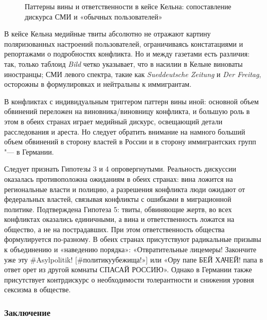 \begin{figure}[ht]
	\caption{Паттерны вины и ответственности в кейсе Кельна: сопоставление дискурса СМИ и «обычных пользователей»}\label{fig:blameAndResponsibilityKoln}
\end{figure}

В кейсе Кельна медийные твиты абсолютно не отражают картину поляризованных настроений пользователей, ограничиваясь констатациями и репортажами о подробностях конфликта. Но и между газетами есть различия: так, только таблоид \textit{Bild} четко указывает, что в насилии в Кельне виноваты иностранцы; СМИ левого спектра, такие как \textit{Sueddeutsche Zeitung} и \textit{Der Freitag}, осторожны в формулировках и нейтральны к иммигрантам.

В конфликтах с индивидуальным триггером паттерн вины иной: основной объем обвинений переложен на виновника/виновницу конфликта, и большую роль в этом в обеих странах играет медийный дискурс, освещающий детали расследования и ареста. Но следует обратить внимание на намного больший объем обвинений в сторону властей в России и в сторону иммигрантских групп "--- в Германии.

Следует признать Гипотезы 3 и 4 опровергнутыми. Реальность дискуссии оказалась противоположна ожиданиям в обеих странах: вина ложится на региональные власти и полицию, а разрешения конфликта люди ожидают от федеральных властей, связывая конфликты с ошибками в миграционной политике. Подтверждена Гипотеза 5: твиты, обвиняющие жертв, во всех конфликтах оказались единичными, а вина и ответственность ложатся на общество, а не на пострадавших. При этом ответственность общества формулируется по-разному. В обеих странах присутствуют радикальные призывы к объединению и «наведению порядка»: «Отвратительные лицемеры! Закончите уже эту \#Asylpolitik! [\#политикуубежища!»] или «Ору папе БЕЙ ХАЧЕЙ! папа в ответ орет из другой комнаты СПАСАЙ РОССИЮ». Однако в Германии также присутствует контрдискурс о необходимости толерантности и снижения уровня сексизма в обществе.

\subsubsection{Заключение}

